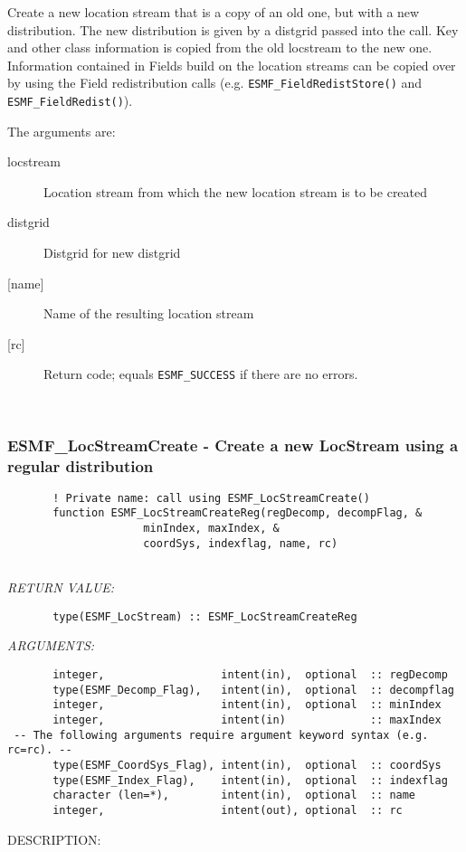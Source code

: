  
       Create a new location stream that is a copy of an old one, but with a new
       distribution. The new distribution is given by a distgrid passed into the call.
       Key and other class information is copied from the old locstream to the new one. 
       Information contained in Fields build on the location streams can be copied over
       by using the Field redistribution calls (e.g. {\tt ESMF\_FieldRedistStore()} 
       and {\tt ESMF\_FieldRedist()}).   
  
       The arguments are:
       \begin{description}
        \item[locstream]
            Location stream from which the new location stream is to be created
        \item[distgrid]
            Distgrid for new distgrid
        \item[{[name]}]
            Name of the resulting location stream
        \item[{[rc]}]
            Return code; equals {\tt ESMF\_SUCCESS} if there are no errors.
       \end{description}
   
 
\mbox{}\hrulefill\ 
 
\subsubsection [ESMF\_LocStreamCreate] {ESMF\_LocStreamCreate - Create a new LocStream using a regular distribution}


 
\begin{verbatim}       ! Private name: call using ESMF_LocStreamCreate()
       function ESMF_LocStreamCreateReg(regDecomp, decompFlag, &
                     minIndex, maxIndex, &
                     coordSys, indexflag, name, rc)
 
 \end{verbatim}{\em RETURN VALUE:}
\begin{verbatim}       type(ESMF_LocStream) :: ESMF_LocStreamCreateReg
 \end{verbatim}{\em ARGUMENTS:}
\begin{verbatim}       integer,                  intent(in),  optional  :: regDecomp
       type(ESMF_Decomp_Flag),   intent(in),  optional  :: decompflag
       integer,                  intent(in),  optional  :: minIndex
       integer,                  intent(in)             :: maxIndex
 -- The following arguments require argument keyword syntax (e.g. rc=rc). --
       type(ESMF_CoordSys_Flag), intent(in),  optional  :: coordSys
       type(ESMF_Index_Flag),    intent(in),  optional  :: indexflag
       character (len=*),        intent(in),  optional  :: name
       integer,                  intent(out), optional  :: rc\end{verbatim}
{\sf DESCRIPTION:\\ }


